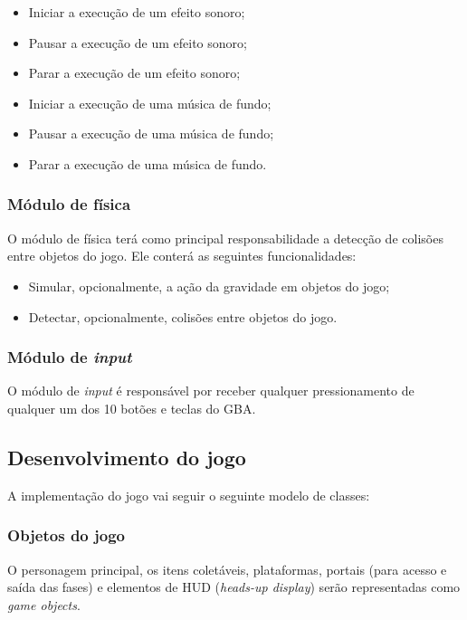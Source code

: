       \begin{itemize}
        \item Iniciar a execução de um efeito sonoro;
        \item Pausar a execução de um efeito sonoro;
        \item Parar a execução de um efeito sonoro;
        \item Iniciar a execução de uma música de fundo;
        \item Pausar a execução de uma música de fundo;
        \item Parar a execução de uma música de fundo.
      \end{itemize}

    \subsubsection{Módulo de física}

      O módulo de física terá como principal responsabilidade a detecção de colisões entre objetos do jogo. Ele conterá as seguintes funcionalidades:

      \begin{itemize}
        \item Simular, opcionalmente, a ação da gravidade em objetos do jogo;
        \item Detectar, opcionalmente, colisões entre objetos do jogo.
      \end{itemize}

    \subsubsection{Módulo de \textit{input}}

      O módulo de \textit{input} é responsável por receber qualquer pressionamento de qualquer um dos 10 botões e teclas do GBA.

  \subsection{Desenvolvimento do jogo}

    A implementação do jogo vai seguir o seguinte modelo de classes:

    \subsubsection{Objetos do jogo}

      O personagem principal, os itens coletáveis, plataformas, portais (para acesso e saída das fases) e elementos de HUD (\textit{heads-up display}) serão representadas como \textit{game objects}.

